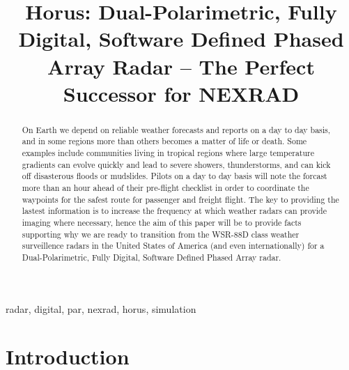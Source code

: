 \documentclass[conference]{IEEEtran}
\begin{document}
\title{Horus: Dual-Polarimetric, Fully Digital, Software Defined Phased Array Radar -- The Perfect Successor for NEXRAD\\
}

\author{

}

\maketitle

\begin{abstract}
On Earth we depend on reliable weather forecasts and reports on a day to day basis, and in some regions more than others becomes a matter of life or death. Some examples include communities living in tropical regions where large temperature gradients can evolve quickly and lead to severe showers, thunderstorms, and can kick off disasterous floods or mudslides\cite{b1}. Pilots on a day to day basis will note the forcast more than an hour ahead of their pre-flight checklist in order to coordinate the waypoints for the safest route for passenger and freight flight\cite{b1}. The key to providing the lastest information is to increase the frequency at which weather radars can provide imaging where necessary, hence the aim of this paper will be to provide facts supporting why we are ready to transition from the WSR-88D class weather surveillence radars in the United States of America (and even internationally) for a Dual-Polarimetric, Fully Digital, Software Defined Phased Array radar. 
\end{abstract}

\begin{IEEEkeywords}
radar, digital, par, nexrad, horus, simulation
\end{IEEEkeywords}
\section{Introduction}
\end{document}
